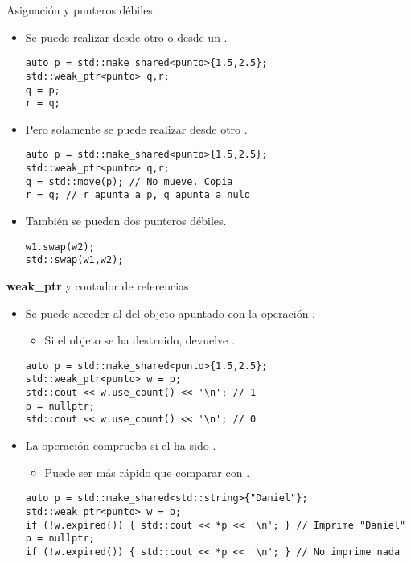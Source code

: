 \begin{frame}[t,fragile]{Asignación y punteros débiles}
\begin{itemize}
  \item Se puede realizar  desde otro
         o desde un .
\begin{lstlisting}
auto p = std::make_shared<punto>{1.5,2.5};
std::weak_ptr<punto> q,r;
q = p;
r = q;
\end{lstlisting}

  \item Pero solamente se puede realizar 
        desde otro .
\begin{lstlisting}
auto p = std::make_shared<punto>{1.5,2.5};
std::weak_ptr<punto> q,r;
q = std::move(p); // No mueve. Copia
r = q; // r apunta a p, q apunta a nulo
\end{lstlisting}

  \item También se pueden  dos punteros débiles.
\begin{lstlisting}
w1.swap(w2);
std::swap(w1,w2);
\end{lstlisting}
\end{itemize}
\end{frame}

\begin{frame}[t,fragile]{\textbf{weak\_ptr} y contador de referencias}
\begin{itemize}
  \item Se puede acceder al  del objeto apuntado 
        con la operación .
    \begin{itemize}
      \item Si el objeto se ha destruido,  devuelve .
    \end{itemize}
\begin{lstlisting}
auto p = std::make_shared<punto>{1.5,2.5};
std::weak_ptr<punto> w = p;
std::cout << w.use_count() << '\n'; // 1
p = nullptr;
std::cout << w.use_count() << '\n'; // 0
\end{lstlisting}

  \item La operación  comprueba si el 
        ha sido .
    \begin{itemize}
      \item Puede ser más rápido que comparar  con .
    \end{itemize}
\begin{lstlisting}
auto p = std::make_shared<std::string>{"Daniel"};
std::weak_ptr<punto> w = p;
if (!w.expired()) { std::cout << *p << '\n'; } // Imprime "Daniel"
p = nullptr;
if (!w.expired()) { std::cout << *p << '\n'; } // No imprime nada
\end{lstlisting}
\end{itemize}
\end{frame}

